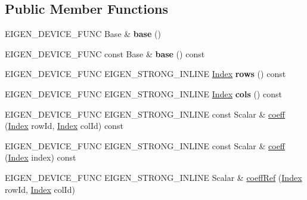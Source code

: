 \subsection*{Public Member Functions}
\begin{DoxyCompactItemize}
\item 
\mbox{\label{class_eigen_1_1_plain_object_base_a322485a0bc534ee24b8ce5c0df68ab50}} 
E\+I\+G\+E\+N\+\_\+\+D\+E\+V\+I\+C\+E\+\_\+\+F\+U\+NC Base \& {\bfseries base} ()
\item 
\mbox{\label{class_eigen_1_1_plain_object_base_a323e8a05899b309009eab82a52d21e86}} 
E\+I\+G\+E\+N\+\_\+\+D\+E\+V\+I\+C\+E\+\_\+\+F\+U\+NC const Base \& {\bfseries base} () const
\item 
\mbox{\label{class_eigen_1_1_plain_object_base_aba7a925ce36c08ba2a08c90086f34718}} 
E\+I\+G\+E\+N\+\_\+\+D\+E\+V\+I\+C\+E\+\_\+\+F\+U\+NC E\+I\+G\+E\+N\+\_\+\+S\+T\+R\+O\+N\+G\+\_\+\+I\+N\+L\+I\+NE \hyperlink{namespace_eigen_a62e77e0933482dafde8fe197d9a2cfde}{Index} {\bfseries rows} () const
\item 
\mbox{\label{class_eigen_1_1_plain_object_base_a10b8b33b7587da564415561aa246f78f}} 
E\+I\+G\+E\+N\+\_\+\+D\+E\+V\+I\+C\+E\+\_\+\+F\+U\+NC E\+I\+G\+E\+N\+\_\+\+S\+T\+R\+O\+N\+G\+\_\+\+I\+N\+L\+I\+NE \hyperlink{namespace_eigen_a62e77e0933482dafde8fe197d9a2cfde}{Index} {\bfseries cols} () const
\item 
E\+I\+G\+E\+N\+\_\+\+D\+E\+V\+I\+C\+E\+\_\+\+F\+U\+NC E\+I\+G\+E\+N\+\_\+\+S\+T\+R\+O\+N\+G\+\_\+\+I\+N\+L\+I\+NE const Scalar \& \hyperlink{class_eigen_1_1_plain_object_base_afbfc12954f16d21aedb7bd839f64a278}{coeff} (\hyperlink{namespace_eigen_a62e77e0933482dafde8fe197d9a2cfde}{Index} row\+Id, \hyperlink{namespace_eigen_a62e77e0933482dafde8fe197d9a2cfde}{Index} col\+Id) const
\item 
E\+I\+G\+E\+N\+\_\+\+D\+E\+V\+I\+C\+E\+\_\+\+F\+U\+NC E\+I\+G\+E\+N\+\_\+\+S\+T\+R\+O\+N\+G\+\_\+\+I\+N\+L\+I\+NE const Scalar \& \hyperlink{class_eigen_1_1_plain_object_base_af592e3993ea3d4ac9f073b42db2c04cc}{coeff} (\hyperlink{namespace_eigen_a62e77e0933482dafde8fe197d9a2cfde}{Index} index) const
\item 
E\+I\+G\+E\+N\+\_\+\+D\+E\+V\+I\+C\+E\+\_\+\+F\+U\+NC E\+I\+G\+E\+N\+\_\+\+S\+T\+R\+O\+N\+G\+\_\+\+I\+N\+L\+I\+NE Scalar \& \hyperlink{class_eigen_1_1_plain_object_base_a25626a55b26a4323565f79d1b7c48ea8}{coeff\+Ref} (\hyperlink{namespace_eigen_a62e77e0933482dafde8fe197d9a2cfde}{Index} row\+Id, \hyperlink{namespace_eigen_a62e77e0933482dafde8fe197d9a2cfde}{Index} col\+Id)

\end{DoxyCompactItemize}
